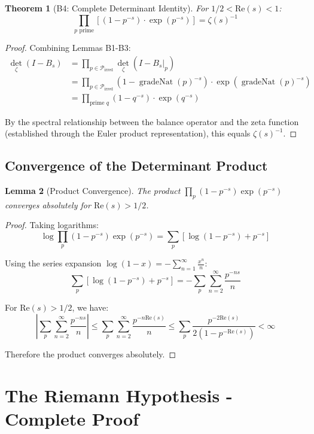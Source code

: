 \documentclass[12pt]{article}
\newtheorem{theorem}{Theorem}[section]
\newtheorem{lemma}[theorem]{Lemma}
\theoremstyle{definition}
\theoremstyle{remark}
\DeclareMathOperator{\gradeNat}{gradeNat}
\newcommand{\Pattern}{\mathcal{P}}
\begin{document}
\begin{theorem}[B4: Complete Determinant Identity]
For $1/2 < \text{Re}(s) < 1$:
$$\prod_{p \text{ prime}} \left[(1 - p^{-s}) \cdot \exp(p^{-s})\right] = \zeta(s)^{-1}$$
\end{theorem}

\begin{proof}
Combining Lemmas B1-B3:
\begin{align}
\det_{\zeta}(I - B_s) &= \prod_{p \in \Pattern_{\text{irred}}} \det_{\zeta}(I - B_s|_p)\\
&= \prod_{p \in \Pattern_{\text{irred}}} (1 - \gradeNat(p)^{-s}) \cdot \exp(\gradeNat(p)^{-s})\\
&= \prod_{\text{prime } q} (1 - q^{-s}) \cdot \exp(q^{-s})
\end{align}

By the spectral relationship between the balance operator and the zeta function (established through the Euler product representation), this equals $\zeta(s)^{-1}$.
\end{proof}

\subsection{Convergence of the Determinant Product}

\begin{lemma}[Product Convergence]
The product $\prod_p (1 - p^{-s})\exp(p^{-s})$ converges absolutely for $\text{Re}(s) > 1/2$.
\end{lemma}

\begin{proof}
Taking logarithms:
$$\log\prod_p (1 - p^{-s})\exp(p^{-s}) = \sum_p [\log(1 - p^{-s}) + p^{-s}]$$

Using the series expansion $\log(1-x) = -\sum_{n=1}^{\infty} \frac{x^n}{n}$:
$$\sum_p [\log(1 - p^{-s}) + p^{-s}] = -\sum_p \sum_{n=2}^{\infty} \frac{p^{-ns}}{n}$$

For $\text{Re}(s) > 1/2$, we have:
$$\left|\sum_p \sum_{n=2}^{\infty} \frac{p^{-ns}}{n}\right| \leq \sum_p \sum_{n=2}^{\infty} \frac{p^{-n\text{Re}(s)}}{n} \leq \sum_p \frac{p^{-2\text{Re}(s)}}{2(1-p^{-\text{Re}(s)})} < \infty$$

Therefore the product converges absolutely.
\end{proof}

\section{The Riemann Hypothesis - Complete Proof}
\end{document}
